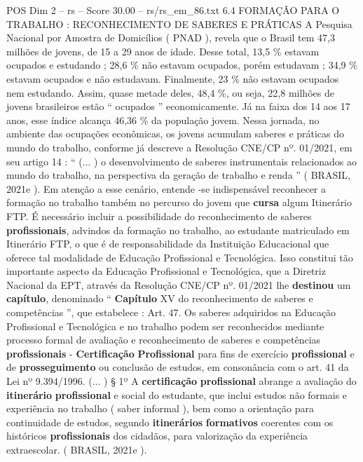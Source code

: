 \begin{textsample}{POS Dim 2 – rs – Score 30.00 – rs/rs\_em\_86.txt}  \label{ex:f2_pos_074}
6.4 FORMAÇÃO PARA O TRABALHO : RECONHECIMENTO DE SABERES E PRÁTICAS A Pesquisa Nacional por Amostra de Domicílios ( PNAD ), revela que o Brasil tem 47,3 milhões de jovens, de 15 a 29 anos de idade.
Desse total, 13,5 \% estavam ocupados e estudando ; 28,6 \% não estavam ocupados, porém estudavam ; 34,9 \% estavam ocupados e não estudavam.
Finalmente, 23 \% não estavam ocupados nem estudando.
Assim, quase metade deles, 48,4 \%, ou seja, 22,8 milhões de jovens brasileiros estão “ ocupados ” economicamente.
Já na faixa dos 14 aos 17 anos, esse índice alcança 46,36 \% da população jovem.
Nessa jornada, no ambiente das ocupações econômicas, os jovens acumulam saberes e práticas do mundo do trabalho, conforme já descreve a Resolução CNE/CP nº. 01/2021, em seu artigo 14 : “ (... ) o desenvolvimento de saberes instrumentais relacionados ao mundo do trabalho, na perspectiva da geração de trabalho e renda ” ( BRASIL, 2021e ).
Em atenção a esse cenário, entende -se indispensável reconhecer a formação no trabalho também no percurso do jovem que \textbf{cursa} algum Itinerário FTP.
É necessário incluir a possibilidade do reconhecimento de saberes \textbf{profissionais}, advindos da formação no trabalho, ao estudante matriculado em Itinerário FTP, o que é de responsabilidade da Instituição Educacional que oferece tal modalidade de Educação Profissional e Tecnológica.
Isso constitui tão importante aspecto da Educação Profissional e Tecnológica, que a Diretriz Nacional da EPT, através da Resolução CNE/CP nº. 01/2021 lhe \textbf{destinou} um \textbf{capítulo}, denominado “ \textbf{Capítulo} XV do reconhecimento de saberes e competências ”, que estabelece : Art. 47.
Os saberes adquiridos na Educação Profissional e Tecnológica e no trabalho podem ser reconhecidos mediante processo formal de avaliação e reconhecimento de saberes e competências \textbf{profissionais} - \textbf{Certificação} \textbf{Profissional} para fins de exercício \textbf{profissional} e de \textbf{prosseguimento} ou conclusão de estudos, em consonância com o art. 41 da Lei nº 9.394/1996. (... ) § 1º A \textbf{certificação} \textbf{profissional} abrange a avaliação do \textbf{itinerário} \textbf{profissional} e social do estudante, que inclui estudos não formais e experiência no trabalho ( saber informal ), bem como a orientação para continuidade de estudos, segundo \textbf{itinerários} \textbf{formativos} coerentes com os históricos \textbf{profissionais} dos cidadãos, para valorização da experiência extraescolar. ( BRASIL, 2021e ).

\end{textsample}
